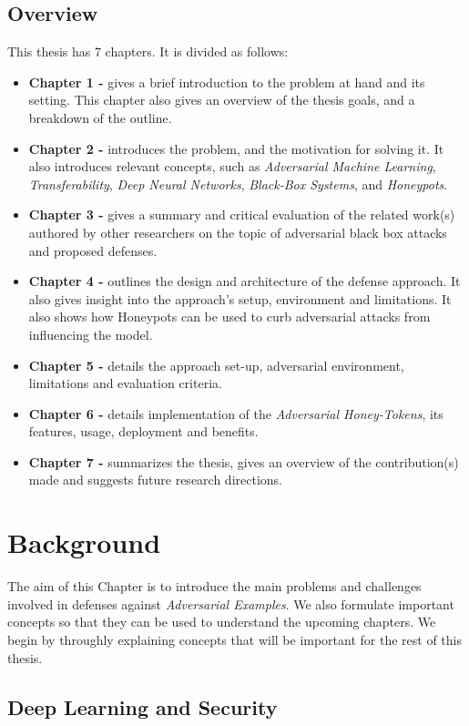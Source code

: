 \documentclass[grad,lot,lof,11pt,oneside,onehalfspace]{RUthesis}
\begin{document}
\section{Overview}
This thesis has  7 chapters. It is divided as follows:
\begin{itemize}
	\item\textbf{Chapter 1 -} gives a brief introduction to the problem at hand and its setting. This chapter also gives an overview of the thesis goals, and a breakdown of the outline.
	\item \textbf{Chapter 2 -} introduces the problem, and the motivation for solving it. It also introduces relevant concepts, such as \textit{Adversarial Machine Learning}, \textit{Transferability}, \textit{Deep Neural Networks}, \textit{Black-Box Systems}, and \textit{Honeypots}.
	\item \textbf{Chapter 3 -} gives a summary and critical evaluation of the related work(s) authored by other researchers on the topic of adversarial black box attacks and proposed defenses. 
	\item \textbf{Chapter 4 -} outlines the design and architecture of the defense approach. It also gives insight into the approach's setup, environment and limitations. It also shows how Honeypots can be used to curb adversarial attacks from influencing the model. 
	\item \textbf{Chapter 5 -} details the approach set-up, adversarial environment, limitations and evaluation criteria. 
	\item \textbf{Chapter 6 -} details implementation of the\textit{ Adversarial Honey-Tokens}, its features, usage, deployment and benefits. 
	\item\textbf{Chapter 7 -} summarizes the thesis, gives an overview of the contribution(s) made and suggests future research directions.
\end{itemize}


\chapter{Background}
The aim of this Chapter is to introduce the main problems and challenges involved in defenses against \textit{Adversarial Examples}. We also formulate important concepts so that they can be used to understand the upcoming chapters. We begin by throughly explaining concepts that will be important for the rest of this thesis. 
\section{Deep Learning and Security}
\end{document}
